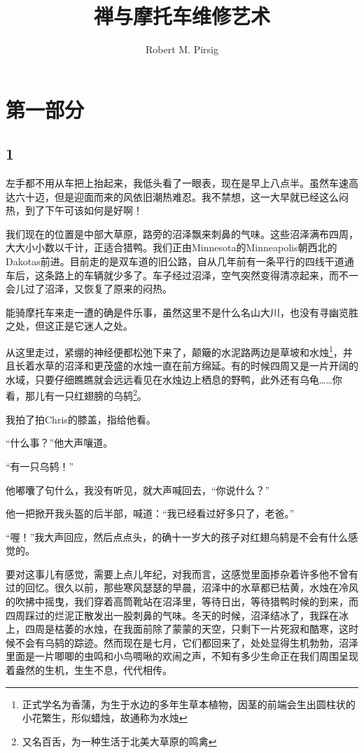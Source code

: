 \documentclass[UTF8]{article}
\title{禅与摩托车维修艺术}
\date{}
\author{Robert M. Pirsig}
\begin{document}
\maketitle
\section*{第一部分}
\subsection*{1}

\par 左手都不用从车把上抬起来，我低头看了一眼表，现在是早上八点半。虽然车速高达六十迈，但是迎面而来的风依旧潮热难忍。我不禁想，这一大早就已经这么闷热，到了下午可该如何是好啊！
\par 我们现在的位置是中部大草原，路旁的沼泽飘来刺鼻的气味。这些沼泽满布四周，大大小小数以千计，正适合猎鸭。我们正由Minnesota的Minneapolis朝西北的Dakotas前进。目前走的是双车道的旧公路，自从几年前有一条平行的四线干道通车后，这条路上的车辆就少多了。车子经过沼泽，空气突然变得清凉起来，而不一会儿过了沼泽，又恢复了原来的闷热。
\par 能骑摩托车来走一遭的确是件乐事，虽然这里不是什么名山大川，也没有寻幽览胜之处，但这正是它迷人之处。
\par 从这里走过，紧绷的神经便都松弛下来了，颠簸的水泥路两边是草坡和水烛\footnote{正式学名为香蒲，为生于水边的多年生草本植物，因茎的前端会生出圆柱状的小花繁生，形似蜡烛，故通称为水烛}，并且长着水草的沼泽和更茂盛的水烛一直在前方绵延。有的时候四周又是一片开阔的水域，只要仔细瞧瞧就会远远看见在水烛边上栖息的野鸭，此外还有乌龟……你看，那儿有一只红翅膀的乌鸫\footnote{又名百舌，为一种生活于北美大草原的鸣禽}。
\par 我拍了拍Chris的膝盖，指给他看。
\par “什么事？”他大声嚷道。
\par “有一只乌鸫！”
\par 他嘟囔了句什么，我没有听见，就大声喊回去，“你说什么？”
\par 他一把掀开我头盔的后半部，喊道：“我已经看过好多只了，老爸。”
\par “喔！”我大声回应，然后点点头，的确十一岁大的孩子对红翅乌鸫是不会有什么感觉的。
\par 要对这事儿有感觉，需要上点儿年纪，对我而言，这感觉里面掺杂着许多他不曾有过的回忆。很久以前，那些寒风瑟瑟的早晨，沼泽中的水草都已枯黄，水烛在冷风的吹拂中摇曳，我们穿着高筒靴站在沼泽里，等待日出，等待猎鸭时候的到来，而四周踩过的烂泥正散发出一股刺鼻的气味。冬天的时候，沼泽结冰了，我踩在冰上，四周是枯萎的水烛，在我面前除了蒙蒙的天空，只剩下一片死寂和酷寒，这时候不会有乌鸫的踪迹。然而现在是七月，它们都回来了，处处显得生机勃勃，沼泽里面是一片唧唧的虫鸣和小鸟啁啾的欢闹之声，不知有多少生命正在我们周围呈现着盎然的生机，生生不息，代代相传。
\end{document}
